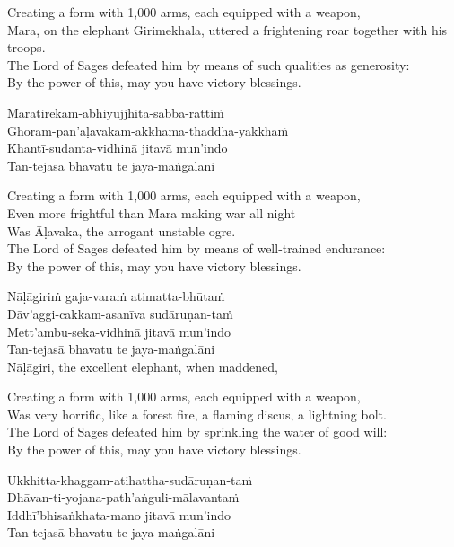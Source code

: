 \begin{english}
  Creating a form with 1,000 arms, each equipped with a weapon,\\
  Mara, on the elephant Girimekhala, uttered a frightening roar together with his troops.\\
  The Lord of Sages defeated him by means of such qualities as generosity:\\
  By the power of this, may you have victory blessings.
\end{english}

Mārātirekam-abhiyujjhita-sabba-rattiṁ\\
Ghoram-pan’āḷavakam-akkhama-thaddha-yakkhaṁ\\
Khantī-sudanta-vidhinā jitavā mun’indo\\
Tan-tejasā bhavatu te jaya-maṅgalāni

\begin{english}
  Creating a form with 1,000 arms, each equipped with a weapon,\\
  Even more frightful than Mara making war all night\\
  Was Āḷavaka, the arrogant unstable ogre.\\
  The Lord of Sages defeated him by means of well-trained endurance:\\
  By the power of this, may you have victory blessings.
\end{english}

Nāḷāgiriṁ gaja-varaṁ atimatta-bhūtaṁ\\
Dāv’aggi-cakkam-asanīva sudāruṇan-taṁ\\
Mett’ambu-seka-vidhinā jitavā mun’indo\\
Tan-tejasā bhavatu te jaya-maṅgalāni\\
Nāḷāgiri, the excellent elephant, when maddened,

\begin{english}
  Creating a form with 1,000 arms, each equipped with a weapon,\\
  Was very horrific, like a forest fire, a flaming discus, a lightning bolt.\\
  The Lord of Sages defeated him by sprinkling the water of good will:\\
  By the power of this, may you have victory blessings.
\end{english}

Ukkhitta-khaggam-atihattha-sudāruṇan-taṁ\\
Dhāvan-ti-yojana-path’aṅguli-mālavantaṁ\\
Iddhī’bhisaṅkhata-mano jitavā mun’indo\\
Tan-tejasā bhavatu te jaya-maṅgalāni

